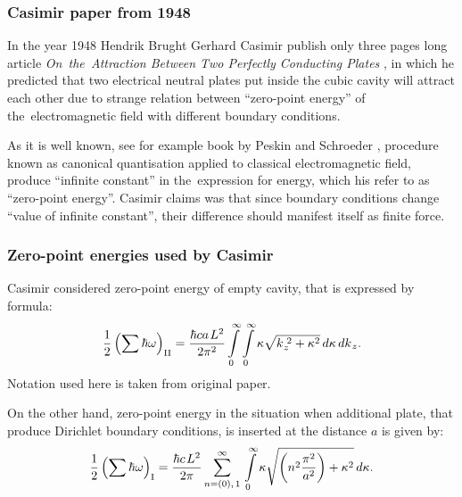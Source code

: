 \documentclass[10pt,t]{beamer}
\begin{document}
\begin{frame}
  \frametitle{Casimir paper from 1948}


  In the year 1948 Hendrik Brught Gerhard Casimir publish only three pages
  long article \textit{On~the~Attraction Between Two Perfectly Conducting
    Plates} \parencite{Casimir-On-the-Attraction-Between-ETC-Pub-1948}, in which
  he predicted that two electrical neutral plates put inside the cubic cavity
  will attract each other due to strange relation between ``zero-point
  energy'' of the~electromagnetic field with different boundary conditions.

  As it is well known, see for example book by Peskin and Schroeder
  \parencite{Peskin-Schroeder-An-Introduction-to-Quantum-Field-Theory-Pub-1995},
  procedure known as canonical quantisation applied to classical
  electromagnetic field, produce ``infinite constant'' in the~expression
  for energy, which his refer to as ``zero-point energy''. Casimir claims
  was that since boundary conditions change ``value of infinite constant'',
  their difference should manifest itself as finite force.

\end{frame}





\begin{frame}
  \frametitle{Zero-point energies used by Casimir}


  Casimir considered zero-point energy of empty cavity, that is expressed
  by formula:
  \begin{equation}
    \label{eq:Herdegens-approach-01}
    \frac{ 1 }{ 2 } \left( \sum \hbar \omega \right)_{ \text{II} } =
    \frac{ \hbar c a \hspace{0.11em} L^{ 2 } }{ 2 \pi^{ 2 } }
    \int\limits_{ 0 }^{ \infty } \int\limits_{ 0 }^{ \infty } \kappa
    \sqrt{ k_{ \hspace{0.05em} z }^{ \,\, 2 } + \kappa^{ 2 } } \, d\kappa \,
    dk_{ \hspace{0.07em} z }.
  \end{equation}
  Notation used here is taken from original paper.

  On the other hand, zero-point energy in the situation when additional
  plate, that produce Dirichlet boundary conditions, is inserted at the
  distance $a$ is given by:
  \begin{equation}
    \label{eq:Herdegens-approach-02}
    \frac{ 1 }{ 2 } \left( \sum \hbar \omega \right)_{ \text{I} } =
    \frac{ \hbar c \hspace{0.11em} L^{ 2 } }{ 2 \pi }
    \sum_{ n = ( 0 ), \, 1 }^{ \infty } \, \int\limits_{ 0 }^{ \infty } \kappa
    \sqrt{ \left( n^{ 2 } \frac{ \pi^{ 2 } }{ a^{ 2 } } \right)
      + \kappa^{ 2 } } \, d\kappa.
  \end{equation}

\end{frame}
\end{document}

